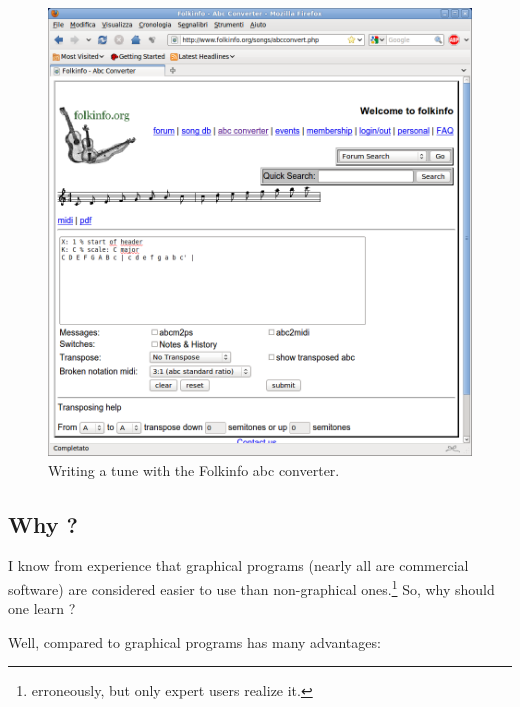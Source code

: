 \documentclass[a4paper,fullpage,12pt]{book}
\begin{document}
\begin{figure}[htbp]
\centering
\includegraphics[width=0.8 \linewidth]{screenshot-folkinfo.png}
\caption{Writing a tune with the Folkinfo abc converter.}
\label{fig:folkinfo}
\end{figure}


\subsection{Why \ABC{}?}

I know from experience that graphical programs (nearly all are
commercial software) are considered easier to use than non-graphical
ones.\footnote{erroneously, but only expert users realize it.} So, why
should one learn \ABC?

Well, compared to graphical programs \ABC{} has many advantages:
\end{document}
